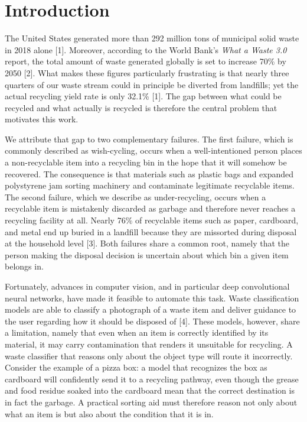 \documentclass[10pt,twocolumn]{article}
\begin{document}
\section{Introduction}
The United States generated more than 292 million tons of municipal solid waste in 2018 alone [1]. Moreover, according to the World Bank's \textit{What a Waste 3.0} report, the total amount of waste generated globally is set to increase 70\% by 2050 [2]. What makes these figures particularly frustrating is that nearly three quarters of our waste stream could in principle be diverted from landfills; yet the actual recycling yield rate is only 32.1\% [1]. The gap between what could be recycled and what actually is recycled is therefore the central problem that motivates this work.

We attribute that gap to two complementary failures. The first failure, which is commonly described as wish-cycling, occurs when a well-intentioned person places a non-recyclable item into a recycling bin in the hope that it will somehow be recovered. The consequence is that materials such as plastic bags and expanded polystyrene jam sorting machinery and contaminate legitimate recyclable items. The second failure, which we describe as under-recycling, occurs when a recyclable item is mistakenly discarded as garbage and therefore never reaches a recycling facility at all. Nearly 76\% of recyclable items such as paper, cardboard, and metal end up buried in a landfill because they are missorted during disposal at the household level [3]. Both failures share a common root, namely that the person making the disposal decision is uncertain about which bin a given item belongs in.

Fortunately, advances in computer vision, and in particular deep convolutional neural networks, have made it feasible to automate this task. Waste classification models are able to classify a photograph of a waste item and deliver guidance to the user regarding how it should be disposed of [4]. These models, however, share a limitation, namely that even when an item is correctly identified by its material, it may carry contamination that renders it unsuitable for recycling. A waste classifier that reasons only about the object type will route it incorrectly. Consider the example of a pizza box: a model that recognizes the box as cardboard will confidently send it to a recycling pathway, even though the grease and food residue soaked into the cardboard mean that the correct destination is in fact the garbage. A practical sorting aid must therefore reason not only about what an item is but also about the condition that it is in.
\end{document}

